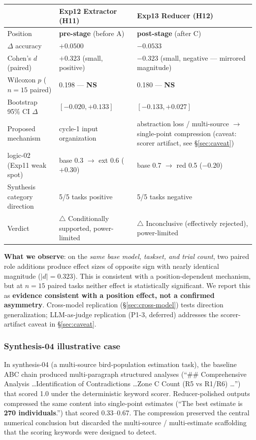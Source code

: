 \documentclass[11pt]{article}
\newcommand{\NS}{\textbf{NS}}
\begin{document}
\begin{table}[h]
\centering
\small
\begin{tabular}{@{}p{}p{}p{}@{}}
\toprule
& Exp12 Extractor (H11) & Exp13 Reducer (H12) \\
\midrule
Position & \textbf{pre-stage} (before A) & \textbf{post-stage} (after C) \\
$\Delta$ accuracy & $+0.0500$ & $-0.0533$ \\
Cohen's $d$ (paired) & $+0.323$ (small, positive) & $-0.323$ (small, negative --- mirrored magnitude) \\
Wilcoxon $p$ ($n\!=\!15$ paired) & 0.198 --- \NS{} & 0.180 --- \NS{} \\
Bootstrap 95\% CI $\Delta$ & $[-0.020, +0.133]$ & $[-0.133, +0.027]$ \\
Proposed mechanism & cycle-1 input organization & abstraction loss / multi-source $\to$ single-point compression (caveat: scorer artifact, see \S\ref{sec:caveat}) \\
logic-02 (Exp11 weak spot) & base 0.3 $\to$ ext 0.6 ($+0.30$) & base 0.7 $\to$ red 0.5 ($-0.20$) \\
Synthesis category direction & 5/5 tasks positive & 5/5 tasks negative \\
Verdict & $\triangle$ Conditionally supported, power-limited & $\triangle$ Inconclusive (effectively rejected), power-limited \\
\bottomrule
\end{tabular}
\end{table}

\textbf{What we observe}: on the \emph{same base model, taskset, and trial count}, two paired role additions produce effect sizes of opposite sign with nearly identical magnitude ($|d|\!=\!0.323$). This is consistent with a position-dependent mechanism, but at $n\!=\!15$ paired tasks neither effect is statistically significant. We report this as \textbf{evidence consistent with a position effect, not a confirmed asymmetry}. Cross-model replication (\S\ref{sec:cross-model}) tests direction generalization; LLM-as-judge replication (P1-3, deferred) addresses the scorer-artifact caveat in \S\ref{sec:caveat}.

\subsubsection{Synthesis-04 illustrative case}
In synthesis-04 (a multi-source bird-population estimation task), the baseline ABC chain produced multi-paragraph structured analyses (``\#\# Comprehensive Analysis \ldots Identification of Contradictions \ldots Zone C Count (R5 vs R1/R6) \ldots'') that scored 1.0 under the deterministic keyword scorer. Reducer-polished outputs compressed the same content into single-point estimates (``The best estimate is \textbf{270 individuals}.'') that scored 0.33--0.67. The compression preserved the central numerical conclusion but discarded the multi-source / multi-estimate scaffolding that the scoring keywords were designed to detect.
\end{document}
